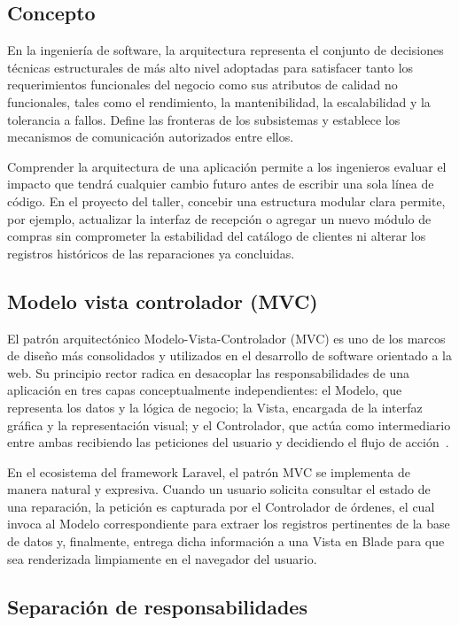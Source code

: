 \subsection{Concepto}

En la ingeniería de software, la arquitectura representa el conjunto de decisiones técnicas estructurales de más alto nivel adoptadas para satisfacer tanto los requerimientos funcionales del negocio como sus atributos de calidad no funcionales, tales como el rendimiento, la mantenibilidad, la escalabilidad y la tolerancia a fallos. Define las fronteras de los subsistemas y establece los mecanismos de comunicación autorizados entre ellos.

Comprender la arquitectura de una aplicación permite a los ingenieros evaluar el impacto que tendrá cualquier cambio futuro antes de escribir una sola línea de código. En el proyecto del taller, concebir una estructura modular clara permite, por ejemplo, actualizar la interfaz de recepción o agregar un nuevo módulo de compras sin comprometer la estabilidad del catálogo de clientes ni alterar los registros históricos de las reparaciones ya concluidas.

\subsection{Modelo vista controlador (MVC)}

El patrón arquitectónico Modelo-Vista-Controlador (MVC) es uno de los marcos de diseño más consolidados y utilizados en el desarrollo de software orientado a la web. Su principio rector radica en desacoplar las responsabilidades de una aplicación en tres capas conceptualmente independientes: el Modelo, que representa los datos y la lógica de negocio; la Vista, encargada de la interfaz gráfica y la representación visual; y el Controlador, que actúa como intermediario entre ambas recibiendo las peticiones del usuario y decidiendo el flujo de acción~\cite{laravel_doc}.

En el ecosistema del framework Laravel, el patrón MVC se implementa de manera natural y expresiva. Cuando un usuario solicita consultar el estado de una reparación, la petición es capturada por el Controlador de órdenes, el cual invoca al Modelo correspondiente para extraer los registros pertinentes de la base de datos y, finalmente, entrega dicha información a una Vista en Blade para que sea renderizada limpiamente en el navegador del usuario.

\subsection{Separación de responsabilidades}

